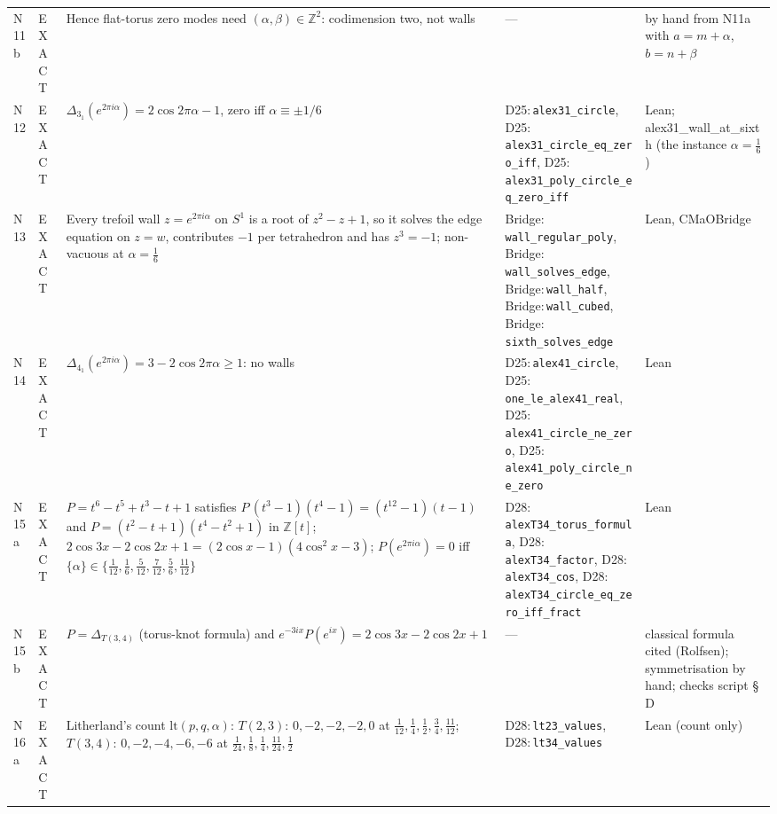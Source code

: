 \documentclass[11pt]{article}
\theoremstyle{definition}
\newcommand{\lean}[1]{\texttt{\small #1}}
\begin{document}
{\begin{longtable}{@{}L{0.05\textwidth}L{0.12\textwidth}L{0.26\textwidth}L{0.27\textwidth}L{0.17\textwidth}@{}}
N11b & EXACT & Hence flat-torus zero modes need $(\alpha,\beta)\in\mathbb Z^2$: codimension two, not walls & --- & by hand from N11a with $a=m+\alpha$, $b=n+\beta$\\
N12 & EXACT & $\Delta_{3_1}(e^{2\pi i\alpha})=2\cos2\pi\alpha-1$, zero iff $\alpha\equiv\pm1/6$ & D25:\,\lean{alex31\_\allowbreak{}circle}, D25:\,\lean{alex31\_\allowbreak{}circle\_\allowbreak{}eq\_\allowbreak{}zero\_\allowbreak{}iff}, D25:\,\lean{alex31\_\allowbreak{}poly\_\allowbreak{}circle\_\allowbreak{}eq\_\allowbreak{}zero\_\allowbreak{}iff} & Lean; alex31\_\allowbreak{}wall\_\allowbreak{}at\_\allowbreak{}sixth (the instance $\alpha=\tfrac16$)\\
N13 & EXACT & Every trefoil wall $z=e^{2\pi i\alpha}$ on $S^1$ is a root of $z^2-z+1$, so it solves the edge equation on $z=w$, contributes $-1$ per tetrahedron and has $z^3=-1$; non-vacuous at $\alpha=\tfrac16$ & Bridge:\,\lean{wall\_\allowbreak{}regular\_\allowbreak{}poly}, Bridge:\,\lean{wall\_\allowbreak{}solves\_\allowbreak{}edge}, Bridge:\,\lean{wall\_\allowbreak{}half}, Bridge:\,\lean{wall\_\allowbreak{}cubed}, Bridge:\,\lean{sixth\_\allowbreak{}solves\_\allowbreak{}edge} & Lean, CMaOBridge\\
N14 & EXACT & $\Delta_{4_1}(e^{2\pi i\alpha})=3-2\cos2\pi\alpha\ge1$: no walls & D25:\,\lean{alex41\_\allowbreak{}circle}, D25:\,\lean{one\_\allowbreak{}le\_\allowbreak{}alex41\_\allowbreak{}real}, D25:\,\lean{alex41\_\allowbreak{}circle\_\allowbreak{}ne\_\allowbreak{}zero}, D25:\,\lean{alex41\_\allowbreak{}poly\_\allowbreak{}circle\_\allowbreak{}ne\_\allowbreak{}zero} & Lean\\
N15a & EXACT & $P=t^6-t^5+t^3-t+1$ satisfies $P\,(t^3-1)(t^4-1)=(t^{12}-1)(t-1)$ and $P=(t^2-t+1)(t^4-t^2+1)$ in $\mathbb Z[t]$; $2\cos3x-2\cos2x+1=(2\cos x-1)(4\cos^2x-3)$; $P(e^{2\pi i\alpha})=0$ iff $\{\alpha\}\in\{\tfrac1{12},\tfrac16,\tfrac5{12},\tfrac7{12},\tfrac56,\tfrac{11}{12}\}$ & D28:\,\lean{alexT34\_\allowbreak{}torus\_\allowbreak{}formula}, D28:\,\lean{alexT34\_\allowbreak{}factor}, D28:\,\lean{alexT34\_\allowbreak{}cos}, D28:\,\lean{alexT34\_\allowbreak{}circle\_\allowbreak{}eq\_\allowbreak{}zero\_\allowbreak{}iff\_\allowbreak{}fract} & Lean\\
N15b & EXACT & $P=\Delta_{T(3,4)}$ (torus-knot formula) and $e^{-3ix}P(e^{ix})=2\cos3x-2\cos2x+1$ & --- & classical formula cited (Rolfsen); symmetrisation by hand; checks script \S\,D\\
N16a & EXACT & Litherland's count $\mathrm{lt}(p,q,\alpha)$: $T(2,3)$: $0,-2,-2,-2,0$ at $\tfrac1{12},\tfrac14,\tfrac12,\tfrac34,\tfrac{11}{12}$; $T(3,4)$: $0,-2,-4,-6,-6$ at $\tfrac1{24},\tfrac18,\tfrac14,\tfrac{11}{24},\tfrac12$ & D28:\,\lean{lt23\_\allowbreak{}values}, D28:\,\lean{lt34\_\allowbreak{}values} & Lean (count only)\\

\end{longtable}}
\end{document}
